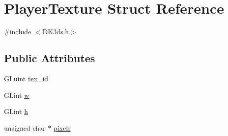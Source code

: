 \hypertarget{struct_player_texture}{\section{Player\-Texture Struct Reference}
\label{struct_player_texture}
}


{\ttfamily \#include $<$D\-K3ds.\-h$>$}

\subsection*{Public Attributes}
\begin{DoxyCompactItemize}
\item 
G\-Luint \hyperlink{struct_player_texture_a575b2f0ae5e77986b6a66aab3805c3ab}{tex\-\_\-id}
\item 
G\-Lint \hyperlink{struct_player_texture_acf6bc46b16bb53bf8599b41282d65117}{w}
\item 
G\-Lint \hyperlink{struct_player_texture_a2b5358c10f1b91f060de579182ec6cd7}{h}
\item 
unsigned char $\ast$ \hyperlink{struct_player_texture_ad61cf88f950df3a4307de8faaef27ef1}{pixels}
\end{DoxyCompactItemize}



